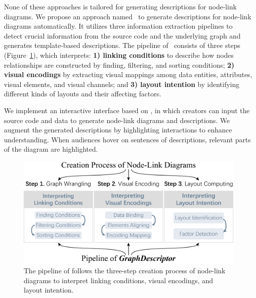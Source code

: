 \iffalse
None of these approaches is tailored for generating descriptions for node-link diagrams. 
We propose an approach named \ApproachName~to generate descriptions for node-link diagrams automatically.
It utilizes three information extraction pipelines to detect crucial information from the source code and the underlying graph and generates template-based descriptions.
The pipeline of \ApproachName~consists of three steps (Figure~\ref{fig:workflow}), which interprets:
\textbf{1) linking conditions} to describe how nodes relationships are constructed by finding, filtering, and sorting conditions;
\textbf{2) visual encodings} by extracting visual mappings among data entities, attributes, visual elements, and visual channels; and
\textbf{3) layout intention} by identifying different kinds of layouts and their affecting factors.

We implement an interactive interface based on \ApproachName, in which creators can input the source code and data to generate node-link diagrams and descriptions.
We augment the generated descriptions by highlighting interactions to enhance understanding.
When audiences hover on sentences of descriptions, relevant parts of the diagram are highlighted.

\begin{figure}
    \centering
    \includegraphics[width=1\columnwidth]{figures/workflow.eps}
    \caption{The pipeline of \textit{\ApproachName} follows the three-step creation process of node-link diagrams to interpret linking conditions, visual encodings, and layout intention.}
    \label{fig:workflow}
\end{figure}


